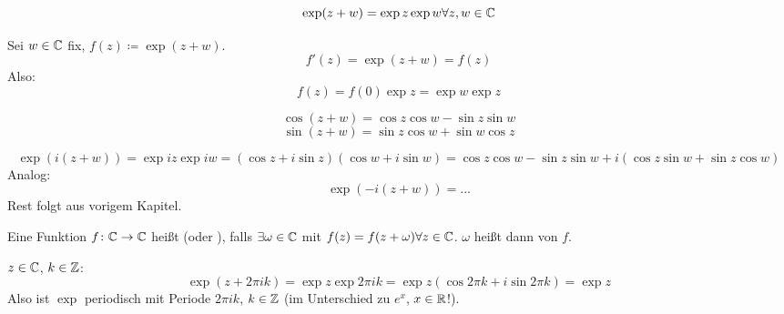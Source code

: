 \begin{satz}
	\[ \exp(z+w)=\exp z\exp w\forall z,w\in\mathbb{C} \]
\end{satz}
\begin{beweis}
	Sei $ w\in\mathbb{C} $ fix, $ f(z)\coloneqq\exp(z+w) $.
	\[ f'(z)=\exp(z+w)=f(z) \]
	Also:
	\[ f(z)=f(0)\exp z=\exp w\exp z \]
\end{beweis}
\begin{satz}
	\[ \cos(z+w)=\cos z\cos w-\sin z\sin w \]
	\[ \sin(z+w)=\sin z\cos w+\sin w\cos z \]
\end{satz}
\begin{beweis}
	\[ \exp (i(z+w))=\exp iz\exp iw=(\cos z+i\sin z)(\cos w+i\sin w)=\cos z\cos w-\sin z\sin w+i(\cos z\sin w+\sin z\cos w) \]
	Analog:
	\[ \exp(-i(z+w))=... \]
	Rest folgt aus vorigem Kapitel.
\end{beweis}
\begin{definition}
	Eine Funktion $ f\colon\mathbb{C}\rightarrow\mathbb{C} $ hei\ss t  (oder ), falls $ \exists\omega\in\mathbb{C} $ mit $ f(z)=f(z+\omega)\forall z\in\mathbb{C} $. $ \omega $ hei\ss t dann  von $ f $.
\end{definition}
\begin{beispiel*}
	$ z\in\mathbb{C} $, $ k\in\mathbb{Z} $:
	\[ \exp(z+2\pi ik)=\exp z\exp 2\pi ik=\exp z(\cos 2\pi k+i\sin 2\pi k)=\exp z \]
	Also ist $ \exp $ periodisch mit Periode $ 2\pi i k $, $ k\in\mathbb{Z} $ (im Unterschied zu $ e^x $, $ x\in\mathbb{R} $!).
\end{beispiel*}
